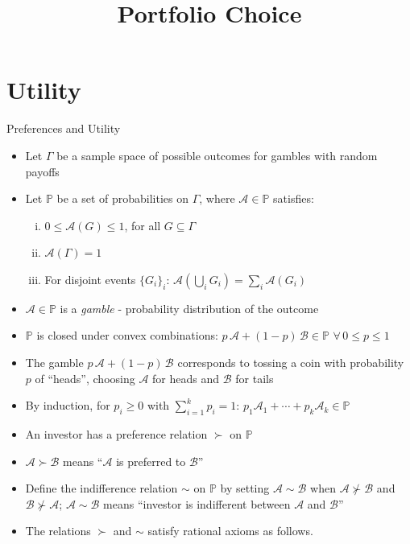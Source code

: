 \documentclass[10pt,handout]{beamer}
\title{Portfolio Choice}
\author{}
\date{}
\theoremstyle{definition}
\begin{document}
\begin{frame}
\titlepage
\end{frame}


\section{Utility}

\begin{frame}{Preferences and Utility}
  \begin{itemize}[<+->]
    \item Let $\Gamma$ be a sample space of possible outcomes for gambles with random payoffs
    \item Let $\mathbb{P}$ be a set of probabilities on $\Gamma$, where $\mathcal{A} \in \mathbb{P}$ satisfies:
      \begin{enumerate}[(i)]
        \item $0 \leqslant \mathcal{A}(G) \leqslant 1$, for all $G \subseteq \Gamma$
        \item $\mathcal{A}(\Gamma) = 1$
        \item For disjoint events $\{G_i\}_i$: $\mathcal{A}\left(\bigcup_i G_i\right) = \sum_i \mathcal{A}(G_i)$
      \end{enumerate}
    \item $\mathcal{A} \in \mathbb{P}$ is a \emph{gamble} - probability distribution of the outcome
    \item $\mathbb{P}$ is closed under convex combinations: $p\,\mathcal{A} + (1-p)\,\mathcal{B} \in \mathbb{P}$ $\forall\,0 \leqslant p \leqslant 1$
    \item The gamble $p\,\mathcal{A} + (1-p)\,\mathcal{B}$ corresponds to tossing a coin with probability $p$ of ``heads'', choosing $\mathcal{A}$ for heads and $\mathcal{B}$ for tails
    \item By induction, for $p_i \geqslant 0$ with $\sum_{i=1}^k p_i = 1$: $p_1\mathcal{A}_1 + \cdots + p_k\mathcal{A}_k \in \mathbb{P}$
    \item An investor has a preference relation $\succ$ on $\mathbb{P}$
    \item $\mathcal{A} \succ \mathcal{B}$ means ``$\mathcal{A}$ is preferred to $\mathcal{B}$''
    \item Define the indifference relation $\sim$ on $\mathbb{P}$ by setting $\mathcal{A} \sim \mathcal{B}$ when $\mathcal{A} \not\succ \mathcal{B}$ and $\mathcal{B} \not\succ \mathcal{A}$; $\mathcal{A} \sim \mathcal{B}$ means ``investor is indifferent between $\mathcal{A}$ and $\mathcal{B}$''
    \item The relations $\succ$ and $\sim$ satisfy rational axioms as follows.
  \end{itemize}
\end{frame}
\end{document}
